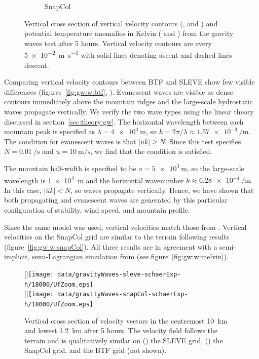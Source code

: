 \begin{figure}
\begin{subfigure}[b]{0.48\textwidth}
		\caption{SnapCol}
		\label{fig:gw:thetaDiff:snapCol}
	\end{subfigure}
%
	\caption{Vertical cross section of vertical velocity contours (,  and ) and potential temperature anomalies in Kelvin ( and ) from the gravity waves test after 5 hours.  Vertical velocity contours are every \SI{5e-2}{\meter\per\second} with solid lines denoting ascent and dashed lines descent.}
	\label{fig:gw:w}
\end{figure}

Comparing vertical velocity contours between BTF and SLEVE show few visible differences (figures~\ref{fig:gw:w:btf}, ).  Evanescent waves are visible as dense contours immediately above the mountain ridges and the large-scale hydrostatic waves propagate vertically.  We verify the two wave types using the linear theory discussed in section~\ref{sec:theory:gw}.  The horizontal wavelength between each mountain peak is specified as $\lambda = \SI{4e3}{\meter}$, so $k = 2 \pi / \lambda \approx \SI{1.57e-3}{\per\meter}$.  The condition for evanescent waves is that $| \overline{u}k | \geq N$.  Since this test specifies $N = \SI{0.01}{\per\second}$ and $\overline{u} = \SI{10}{\meter\per\second}$, we find that the condition is satisfied.

The mountain half-width is specified to be $a = \SI{5e3}{\meter}$, so the large-scale wavelength is \SI{1e4}{\meter} and the horizontal wavenumber $k \approx \SI{6.28e-4}{\per\meter}$.  In this case, $| \overline{u}k | < N$, so waves propagate vertically.  Hence, we have shown that both propagating and evanescent waves are generated by this particular configuration of stability, wind speed, and mountain profile.

Since the same model was used, vertical velocities match those from \textcite{weller-shahrokhi2014}.  Vertical velocities on the SnapCol grid are similar to the terrain following results (figure~\ref{fig:gw:w:snapCol}).  All three results are in agreement with a semi-implicit, semi-Lagrangian simulation from \textcite{melvin2010} (see figure~\ref{fig:gw:w:melvin}).

\begin{figure}
	\captionsetup[subfigure]{position=b}
	\centering
	[\textwidth]{\texttt{[image: data/gravityWaves-sleve-schaerExp-h/18000/UfZoom.eps]}} \\
	[\textwidth]{\texttt{[image: data/gravityWaves-snapCol-schaerExp-h/18000/UfZoom.eps]}}
%
	\caption{Vertical cross section of velocity vectors in the centremost \SI{10}{\kilo\meter} and lowest \SI{1.2}{\kilo\meter} after 5 hours.  The velocity field follows the terrain and is qualitatively similar on () the SLEVE grid, () the SnapCol grid, and the BTF grid (not shown).}
	\label{fig:gw:flow}
\end{figure}

